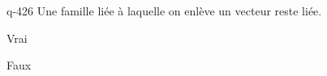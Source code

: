 \begin{truefalse}{q-426}
Une famille liée à laquelle on enlève un vecteur reste liée.
\item Vrai
\item* Faux
\end{truefalse}

